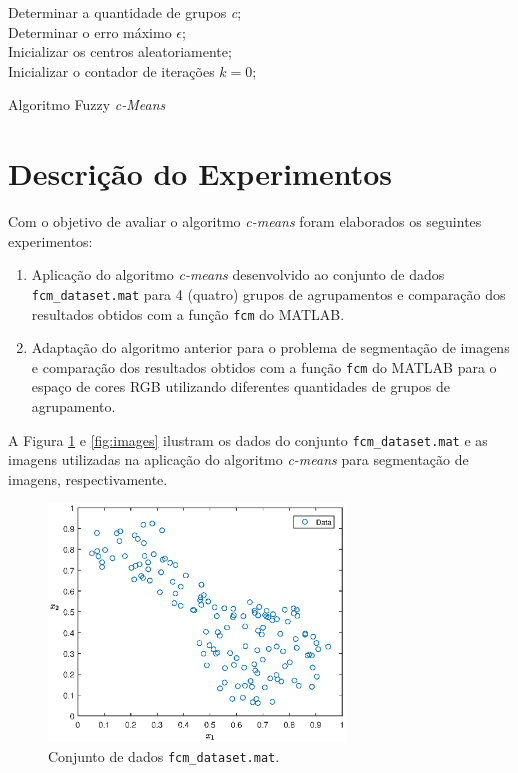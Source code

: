 \documentclass[12pt,a4paper]{article}
\numberwithin{equation}{section}
\begin{document}
\begin{algorithm}[H] \label{alg:cmeans}
	Determinar a quantidade de grupos \textit{c}; \\
	Determinar o erro máximo $\epsilon$;\\
	Inicializar os centros aleatoriamente;\\
	Inicializar o contador de iterações $k=0$;\\
	\caption{Algoritmo Fuzzy \textit{c-Means}}
\end{algorithm}

\section{Descrição do Experimentos}
\label{section:descr}

Com o objetivo de avaliar o algoritmo \textit{c-means} foram elaborados os seguintes experimentos:

\begin{enumerate}
	\item Aplicação do algoritmo \textit{c-means} desenvolvido ao conjunto de dados \texttt{fcm\_dataset.mat} para 4 (quatro) grupos de agrupamentos e comparação dos resultados obtidos com a função \texttt{fcm} do MATLAB.
	\item Adaptação do algoritmo anterior para o problema de segmentação de imagens e comparação dos resultados obtidos com a função \texttt{fcm} do MATLAB para o espaço de cores RGB utilizando diferentes quantidades de grupos de agrupamento.
\end{enumerate}

A Figura \ref{fig:fcmdata} e \ref{fig:images} ilustram os dados do conjunto \texttt{fcm\_dataset.mat} e as imagens utilizadas na aplicação do algoritmo \textit{c-means} para segmentação de imagens, respectivamente.

\begin{figure}[ht!]
	\centering
	\includegraphics[width=0.7\textwidth]{figures/data.eps}
	\caption{Conjunto de dados \texttt{fcm\_dataset.mat}.}
	\label{fig:fcmdata}
\end{figure}
\end{document}
